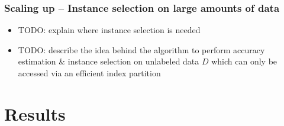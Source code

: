 \documentclass[11pt]{beamer}
\newlength{\wideitemsep}
\let\olditem\item
\renewcommand{\item}{\setlength{\itemsep}{\wideitemsep}\olditem}
\begin{document}
\begin{frame}
\frametitle{Scaling up -- Instance selection on large amounts of data} 
\begin{itemize}
\item TODO: explain where instance selection is needed
\item TODO: describe the idea behind the algorithm to perform accuracy estimation \& instance selection on unlabeled data $D$ which can only be accessed via an efficient index partition 
\end{itemize}
\end{frame}

\section{Results}
\end{document}

